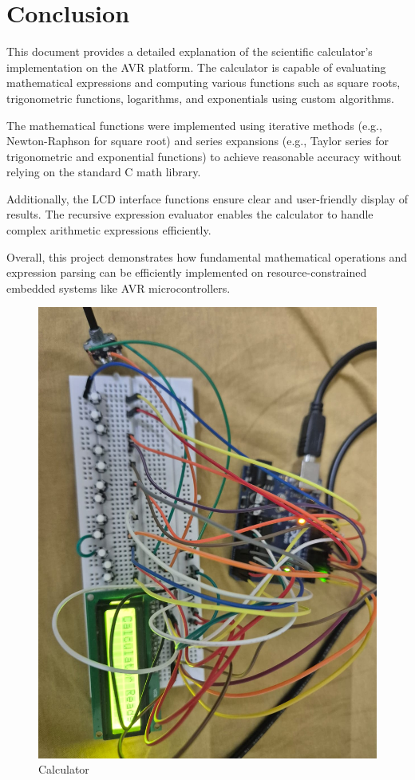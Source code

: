 \documentclass[journal]{IEEEtran}
\begin{document}
\section{Conclusion}
This document provides a detailed explanation of the scientific calculator's implementation on the AVR platform. The calculator is capable of evaluating mathematical expressions and computing various functions such as square roots, trigonometric functions, logarithms, and exponentials using custom algorithms. 

The mathematical functions were implemented using iterative methods (e.g., Newton-Raphson for square root) and series expansions (e.g., Taylor series for trigonometric and exponential functions) to achieve reasonable accuracy without relying on the standard C math library. 

Additionally, the LCD interface functions ensure clear and user-friendly display of results. The recursive expression evaluator enables the calculator to handle complex arithmetic expressions efficiently. 

Overall, this project demonstrates how fundamental mathematical operations and expression parsing can be efficiently implemented on resource-constrained embedded systems like AVR microcontrollers.

\begin{figure}[H]
    \centering
    \includegraphics[width=0.7\linewidth]{Figs/calculator.png}
    \caption{Calculator}
    \label{fig:enter-label}
\end{figure}
\end{document}
